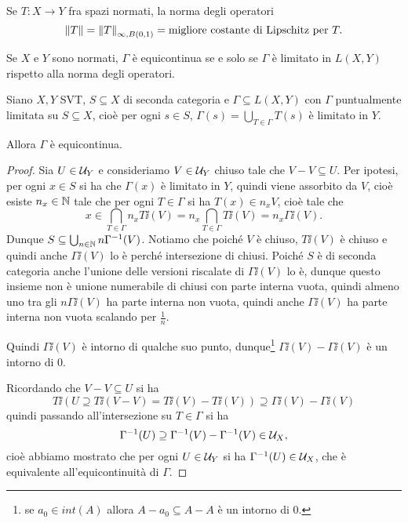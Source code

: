 \begin{remark}
Se $T:X\to Y$ fra spazi normati, la norma degli operatori
\[\left\Vert{T}\right\Vert=\left\Vert{T}\right\Vert_{\infty,B(0,1)}=\text{migliore costante di Lipschitz per }T.\]
\end{remark}

\begin{example}
Se $X$ e $Y$ sono normati, $\Gamma$ \`e equicontinua se e solo se $\Gamma$ \`e limitato in $L(X,Y)$ rispetto alla norma degli operatori.
\end{example}

\begin{theorem}\label{ThBanachSteinhausUniformeLimitatezza}
Siano $X,Y$ SVT, $S\subseteq X$ di seconda categoria e $\Gamma\subseteq L(X,Y)$ con $\Gamma$ puntualmente limitata su $S\subseteq X$, cio\`e per ogni $s\in S$, $\Gamma(s)=\bigcup_{T\in \Gamma} T(s)$ \`e limitato in $Y$.

Allora $\Gamma$ \`e equicontinua.
\end{theorem}
\begin{proof}
Sia $U\in\mathcal{U}_Y$ e consideriamo $V\in\mathcal{U}_Y$ chiuso tale che $V-V\subseteq U$. Per ipotesi, per ogni $x\in S$ si ha che $\Gamma(x)$ \`e limitato in $Y$, quindi viene assorbito da $V$, cio\`e esiste $n_x\in\mathbb{N}$ tale che per ogni $T\in\Gamma$ si ha $T(x)\in n_x V$, cio\`e tale che
\[x\in\bigcap_{T\in \Gamma}n_xT\ii(V)=n_x\bigcap_{T\in \Gamma}T\ii(V)=n_x\Gamma\ii(V).\]
Dunque $S\subseteq \bigcup_{n\in\mathbb{N}}n\Gamma^{-1}(V)$. Notiamo che poich\'e $V$ \`e chiuso, $T\ii(V)$ \`e chiuso e quindi anche $\Gamma\ii(V)$ lo \`e perch\'e intersezione di chiusi. Poich\'e $S$ \`e di seconda categoria anche l'unione delle versioni riscalate di $\Gamma\ii(V)$ lo \`e, dunque questo insieme non \`e unione numerabile di chiusi con parte interna vuota, quindi almeno uno tra gli $n\Gamma\ii(V)$ ha parte interna non vuota, quindi anche $\Gamma\ii(V)$ ha parte interna non vuota scalando per $\frac1n$.

Quindi $\Gamma\ii(V)$ \`e intorno di qualche suo punto, dunque\footnote{se $a_0\in int(A)$ allora $A-a_0\subseteq A-A$ \`e un intorno di $0$.} $\Gamma\ii(V)-\Gamma\ii(V)$ \`e un intorno di $0$. 

Ricordando che $V-V\subseteq U$ si ha
\[T\ii(U\supseteq T\ii(V-V)=T\ii(V)-T\ii(V))\supseteq \Gamma\ii(V)-\Gamma\ii(V)\]
quindi passando all'intersezione su $T\in\Gamma$ si ha
\[\Gamma^{-1}(U)\supseteq \Gamma^{-1}(V)-\Gamma^{-1}(V)\in\mathcal{U}_X,\]
cio\`e abbiamo mostrato che per ogni $U\in\mathcal{U}_Y$ si ha $\Gamma^{-1}(U)\in\mathcal{U}_X$, che \`e equivalente all'equicontinuit\`a di $\Gamma$.
\end{proof}

